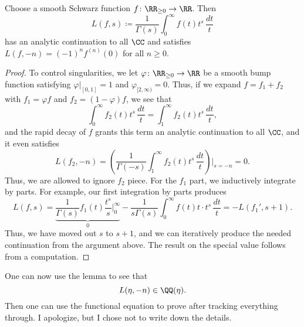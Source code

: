 \documentclass{article}
\begin{document}
\begin{lemma}
	Choose a smooth Schwarz function $f\colon\RR_{\ge0}\to\RR$. Then
	\[L(f,s)\coloneqq\frac1{\Gamma(s)}\int_0^\infty f(t)t^{s}\,\frac{dt}t\]
	has an analytic continuation to all $\CC$ and satisfies $L(f,-n)=(-1)^nf^{(n)}(0)$ for all $n\ge0$.
\end{lemma}
\begin{proof}
	To control singularities, we let $\varphi\colon\RR_{\ge0}\to\RR$ be a smooth bump function satisfying $\varphi|_{[0,1]}=1$ and $\varphi_{[2,\infty)}=0$. Thus, if we expand $f=f_1+f_2$ with $f_1=\varphi f$ and $f_2=(1-\varphi)f$, we see that
	\[\int_0^\infty f_2(t)t^s\,\frac{dt}t=\int_1^\infty f_2(t)t^s\,\frac{dt}t,\]
	and the rapid decay of $f$ grants this term an analytic continuation to all $\CC$, and it even satisfies
	\[L(f_2,-n)=\left(\frac1{\Gamma(-s)}\int_1^\infty f_2(t)t^s\,\frac{dt}t\right)\Bigg|_{s=-n}=0.\]
	Thus, we are allowed to ignore $f_2$ piece. For the $f_1$ part, we inductively integrate by parts. For example, our first integration by parts produces
	\[L(f,s)=\underbrace{\frac1{\Gamma(s)}f_1(t)\frac{t^s}s\bigg|_0^\infty}_0-\frac1{s\Gamma(s)}\int_0^\infty f(t)t\cdot t^s\,\frac{dt}t=-L(f_1',s+1).\]
	Thus, we have moved out $s$ to $s+1$, and we can iteratively produce the needed continuation from the argument above. The result on the special value follows from a computation.
\end{proof}
One can now use the lemma to see that
\[L(\eta,-n)\in\QQ(\eta).\]
Then one can use the functional equation  to prove  after tracking everything through. I apologize, but I chose not to write down the details.
\end{document}
